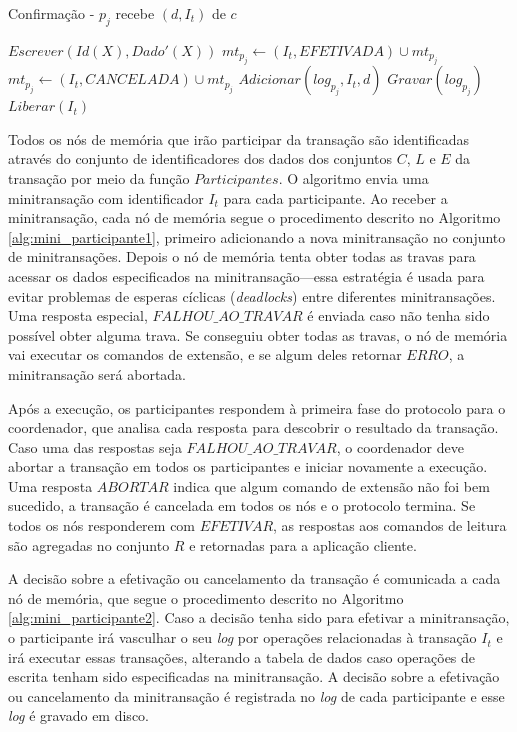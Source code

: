 \documentclass[11pt,twoside,a4paper]{book}
\begin{document}
\begin{algorithm}
    \caption{Confirmação - $p_j$ recebe $(d, I_t)$ de $c$}
    \label{alg:mini_participante2}
    \dontprintsemicolon
    \Inicio
    {
        {    
            {    
                $Escrever(Id(X), Dado'(X))$\;
            }
            $mt_{p_j} \gets (I_t, EFETIVADA) \cup mt_{p_j}$\;
        }
        {
            $mt_{p_j} \gets (I_t, CANCELADA) \cup mt_{p_j}$\;
        }
        $Adicionar(log_{p_j}, I_t, d)$\;
        $Gravar(log_{p_j})$\;
        $Liberar(I_t)$\;
    }
\end{algorithm}

Todos os nós de memória que irão participar da transação são identificadas através do conjunto de identificadores dos dados dos conjuntos $C$, $L$ e $E$ da transação por meio da função $Participantes$. O algoritmo envia uma minitransação com identificador $I_t$ para cada participante. Ao receber a minitransação, cada nó de memória segue o procedimento descrito no Algoritmo \ref{alg:mini_participante1}, primeiro adicionando a nova minitransação no conjunto de minitransações. Depois o nó de memória tenta obter todas as travas para acessar os dados especificados na minitransação---essa estratégia é usada para evitar problemas de esperas cíclicas (\emph{deadlocks}) entre diferentes minitransações. Uma resposta especial, $FALHOU\_AO\_TRAVAR$ é enviada caso não tenha sido possível obter alguma trava. Se conseguiu obter todas as travas, o nó de memória vai executar os comandos de extensão, e se algum deles retornar $ERRO$, a minitransação será abortada.

Após a execução, os participantes respondem à primeira fase do protocolo para o coordenador, que analisa cada resposta para descobrir o resultado da transação. Caso uma das respostas seja $FALHOU\_AO\_TRAVAR$, o coordenador deve abortar a transação em todos os participantes e iniciar novamente a execução. Uma resposta $ABORTAR$ indica que algum comando de extensão não foi bem sucedido, a transação é cancelada em todos os nós e o protocolo termina. Se todos os nós responderem com $EFETIVAR$, as respostas aos comandos de leitura são agregadas no conjunto $R$ e retornadas para a aplicação cliente. 

A decisão sobre a efetivação ou cancelamento da transação é comunicada a cada nó de memória, que segue o procedimento descrito no Algoritmo \ref{alg:mini_participante2}. Caso a decisão tenha sido para efetivar a minitransação, o participante irá vasculhar o seu \emph{log} por operações relacionadas à transação $I_t$ e irá executar essas transações, alterando a tabela de dados caso operações de escrita tenham sido especificadas na minitransação. A decisão sobre a efetivação ou cancelamento da minitransação é registrada no \emph{log} de cada participante e esse \emph{log} é gravado em disco.
\end{document}
